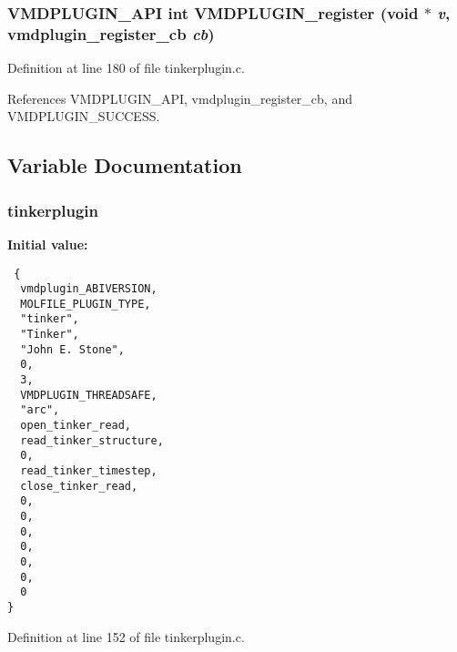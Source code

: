 \subsubsection{\setlength{\rightskip}{0pt plus 5cm}VMDPLUGIN\_\-API int VMDPLUGIN\_\-register (void $\ast$ {\em v}, {\bf vmdplugin\_\-register\_\-cb} {\em cb})}\label{tinkerplugin_8c_a6}




Definition at line 180 of file tinkerplugin.c.

References VMDPLUGIN\_\-API, vmdplugin\_\-register\_\-cb, and VMDPLUGIN\_\-SUCCESS.

\subsection{Variable Documentation}
\subsubsection{ tinkerplugin\hspace{0.3cm}{\tt  [static]}}\label{tinkerplugin_8c_a0}


{\bf Initial value:}

\footnotesize\begin{verbatim} {
  vmdplugin_ABIVERSION,
  MOLFILE_PLUGIN_TYPE,                         
  "tinker",                                    
  "Tinker",                                    
  "John E. Stone",                             
  0,                                           
  3,                                           
  VMDPLUGIN_THREADSAFE,                        
  "arc",
  open_tinker_read,
  read_tinker_structure,
  0,
  read_tinker_timestep,
  close_tinker_read,
  0,
  0,
  0,
  0,
  0,                            
  0,                            
  0                             
}\end{verbatim}\normalsize 


Definition at line 152 of file tinkerplugin.c.